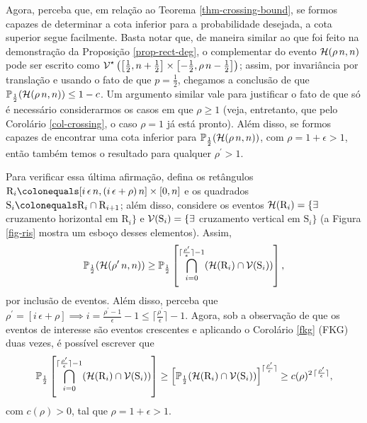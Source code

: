 \par Agora, perceba que, em relação ao Teorema \ref{thm-crossing-bound}, se formos capazes de determinar a cota inferior para a probabilidade desejada, a cota superior segue facilmente. Basta notar que, de maneira similar ao que foi feito na demonstração da Proposição \ref{prop-rect-deg}, o complementar do evento $\operatorname{\mathcal{H}}(\rho\,n,n)$ pode ser escrito como $\operatorname{\mathcal{V}}^{\star}\left(\left[\frac{1}{2}, n + \frac{1}{2}\right]\times\left[-\frac{1}{2}, \rho\,n - \frac{1}{2}\right]\right)$; assim, por invariância por translação e usando o fato de que $p = \frac{1}{2}$, chegamos a conclusão de que $\operatorname{\mathbb{P}}_{\frac{1}{2}}(\operatorname{\mathcal{H}}(\rho\,n, n)) \leq 1-c$. Um argumento similar vale para justificar o fato de que  só é necessário considerarmos os casos em que $\rho \geq 1$ (veja, entretanto, que pelo Corolário \ref{col-crossing}, o caso $\rho = 1$ já está pronto). Além disso, se formos capazes de encontrar uma cota inferior para $\operatorname{\mathbb{P}}_{\frac{1}{2}}(\operatorname{\mathcal{H}}(\rho\,n,n))$, com $\rho = 1 + \epsilon > 1$, então também temos o resultado para qualquer $\rho^{\prime} > 1$. 

Para verificar essa última afirmação, defina os retângulos $\text{R}_i \colonequals [i\,\epsilon\,n,(i\,\epsilon + \rho)\,n] \times [0, n]$ e os quadrados $\text{S}_i \colonequals \text{R}_i \cap \text{R}_{i+1}$; além disso, considere os eventos $\operatorname{\mathcal{H}}(\text{R}_i) = \{\exists$ cruzamento horizontal em $\text{R}_i\}$ e $\operatorname{\mathcal{V}}(\text{S}_i) = \{\exists$ cruzamento vertical em $\text{S}_i\}$ (a Figura \ref{fig-ris} mostra um esboço desses elementos). Assim,
\begin{align*}
	\operatorname{\mathbb{P}}_{\frac{1}{2}}(\operatorname{\mathcal{H}}(\rho^{\prime}\,n,n)) \geq \operatorname{\mathbb{P}}_{\frac{1}{2}}\left[\bigcap_{i = 0}^{\lceil\frac{\rho^{\prime}}{\epsilon}\rceil - 1}(\operatorname{\mathcal{H}}(\text{R}_i) \cap \operatorname{\mathcal{V}}(\text{S}_i))\right],
\end{align*}
por inclusão de eventos. Além disso, perceba que $\rho^{\prime} = [i\,\epsilon + \rho] \implies i = \frac{\rho^{\prime} - 1}{\epsilon} - 1 \leq \lceil\frac{\rho^{\prime}}{\epsilon}\rceil - 1$. Agora, sob a observação de que os eventos de interesse são eventos crescentes e aplicando o Corolário \ref{fkg} (FKG) duas vezes, é possível escrever que
\begin{align*}
\operatorname{\mathbb{P}}_{\frac{1}{2}}\left[\bigcap_{i = 0}^{\lceil\frac{\rho^{\prime}}{\epsilon}\rceil - 1}(\operatorname{\mathcal{H}}(\text{R}_i) \cap \operatorname{\mathcal{V}}(\text{S}_i))\right] \geq \left[\operatorname{\mathbb{P}}_{\frac{1}{2}}(\operatorname{\mathcal{H}}(\text{R}_i) \cap \operatorname{\mathcal{V}}(\text{S}_i))\right]^{\lceil\frac{\rho^{\prime}}{\epsilon}\rceil} \geq c(\rho)^{2\,\lceil\frac{\rho^{\prime}}{\epsilon}\rceil},
\end{align*}
com $c(\rho) > 0$, tal que $\rho = 1 + \epsilon > 1$.

